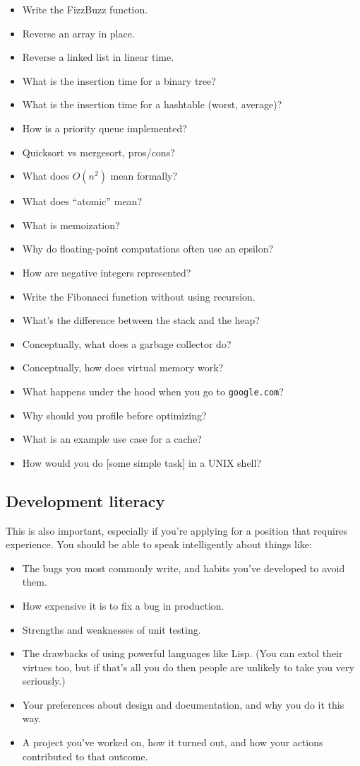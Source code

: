 \documentclass{article}
\begin{document}
\begin{itemize}
\item{Write the FizzBuzz function.}
\item{Reverse an array in place.}
\item{Reverse a linked list in linear time.}
\item{What is the insertion time for a binary tree?}
\item{What is the insertion time for a hashtable (worst, average)?}
\item{How is a priority queue implemented?}
\item{Quicksort vs mergesort, pros/cons?}
\item{What does $O(n^2)$ mean formally?}
\item{What does ``atomic'' mean?}
\item{What is memoization?}
\item{Why do floating-point computations often use an epsilon?}
\item{How are negative integers represented?}
\item{Write the Fibonacci function without using recursion.}
\item{What's the difference between the stack and the heap?}
\item{Conceptually, what does a garbage collector do?}
\item{Conceptually, how does virtual memory work?}
\item{What happens under the hood when you go to {\tt google.com}?}
\item{Why should you profile before optimizing?}
\item{What is an example use case for a cache?}
\item{How would you do [some simple task] in a UNIX shell?}
\end{itemize}

\subsection{Development literacy}
    This is also important, especially if you're applying for a position that
    requires experience. You should be able to speak intelligently about things
    like:

\begin{itemize}
\item{The bugs you most commonly write, and habits you've developed to}
  avoid them.
\item{How expensive it is to fix a bug in production.}
\item{Strengths and weaknesses of unit testing.}
\item{The drawbacks of using powerful languages like Lisp. (You can}
  extol their virtues too, but if that's all you do then people are
  unlikely to take you very seriously.)
\item{Your preferences about design and documentation, and why you do it}
  this way.
\item{A project you've worked on, how it turned out, and how your}
  actions contributed to that outcome.
\end{itemize}
\end{document}

